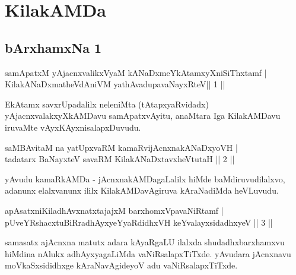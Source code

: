 
\chapter{KilakAMDa}

\section*{bArxhamxNa 1}

\begin{shl}
samApatxM yAjacnxvalikxVyaM kANaDxmeYkAtamxyXniSiThxtamf  | \\
KilakANaDxmatheVdAniVM yathAvadupavaNayxRteV\hfill ||  1 ||  
\end{shl}

\begin{artha}
EkAtamx savxrUpadalilx neleniMta (tAtapxyaRvidadx) yAjacnxvalakxyXkAMDavu samApatxvAyitu, anaMtara Iga KilakAMDavu iruvaMte vAyxKAyxnisalapxDuvudu.
\end{artha}


\begin{shl}
saMBAvitaM na yatUpxvaRM kamaRvijAcnxnakANaDxyoVH |  \\
tadatarx BaNayxteV savaRM KilakANaDxtavxheVtutaH \hfill||  2 ||  
\end{shl}

\begin{artha}
yAvudu kamaRkAMDa - jAcnxnakAMDagaLalilx hiMde baMdiruvudilalxvo, adanunx elalxvanunx ililx KilakAMDavAgiruva kAraNadiMda heVLuvudu.
\end{artha}


\begin{shl}
apAsatxniKiladhAvxnatxtajajxM barxhomxVpavaNiRtamf  | \\
pUveYRshacxtuBiRradhAyxyeYyaRdidhxVH keYvalayxsidadhxyeV \hfill ||  3 ||
\end{shl}

\begin{artha}
samasatx ajAcnxna matutx adara kAyaRgaLU ilalxda shudadhxbarxhamxvu hiMdina nAlukx adhAyxyagaLiMda vaNiRsalapxTiTxde. yAvudara jAcnxnavu moVkaSxsididhxge kAraNavAgideyoV adu vaNiRsalapxTiTxde.
\end{artha}

